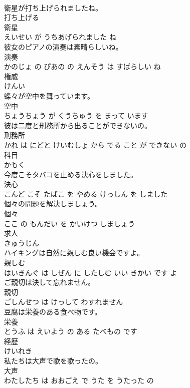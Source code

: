 \documentclass[8pt]{extreport}
\begin{document}
\begin{CJK}{UTF8}{min}
\\	衛星が打ち上げられましたね。	
\\	打ち上げる 
\\	衛星 
\\	えいせい が うちあげられました ね			
\\	彼女のピアノの演奏は素晴らしいね。	
\\	演奏 
\\	かのじょ の ぴあの の えんそう は すばらしい ね			
\\	権威	
\\	けんい			
\\	蝶々が空中を舞っています。	
\\	空中 
\\	ちょうちょう が くうちゅう を まって います			
\\	彼は二度と刑務所から出ることができないの。	
\\	刑務所 
\\	かれ は にどと けいむしょ から でる こと が できない の			
\\	科目	
\\	かもく			
\\	今度こそタバコを止める決心をしました。	
\\	決心 
\\	こんど こそ たばこ を やめる けっしん を しました			
\\	個々の問題を解決しましょう。	
\\	個々 
\\	ここ の もんだい を かいけつ しましょう			
\\	求人	
\\	きゅうじん			
\\	ハイキングは自然に親しむ良い機会ですよ。	
\\	親しむ 
\\	はいきんぐ は しぜん に したしむ いい きかい です よ			
\\	ご親切は決して忘れません。	
\\	親切 
\\	ごしんせつ は けっして わすれません			
\\	豆腐は栄養のある食べ物です。	
\\	栄養 
\\	とうふ は えいよう の ある たべもの です			
\\	経歴	
\\	けいれき			
\\	私たちは大声で歌を歌ったの。	
\\	大声 
\\	わたしたち は おおごえ で うた を うたった の			

\end{CJK}
\end{document}
